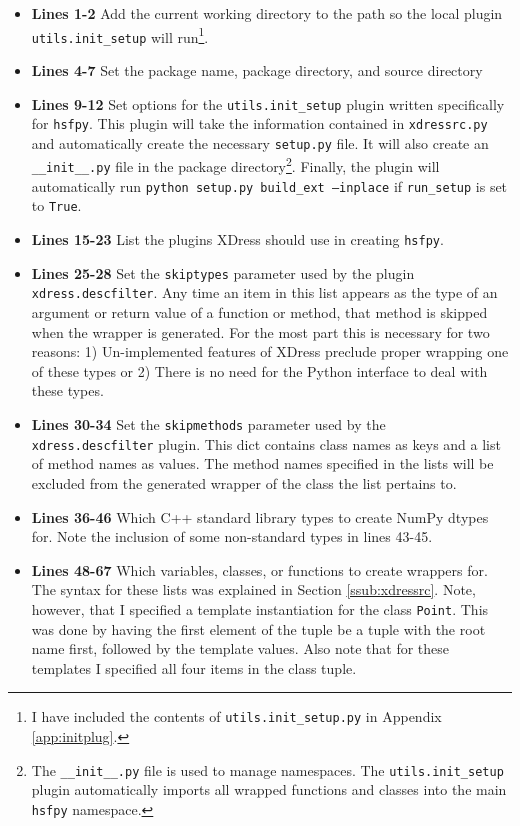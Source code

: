   \begin{itemize}
    \item \textbf{Lines 1-2} Add the current working directory to the path so the local plugin \texttt{utils.init\_setup} will run\footnote{I have included the contents of \texttt{utils.init\_setup.py} in Appendix \ref{app:initplug}.}.
    \item \textbf{Lines 4-7} Set the package name, package directory, and source directory
    \item \textbf{Lines 9-12} Set options for the \texttt{utils.init\_setup} plugin written specifically for \texttt{hsfpy}. This plugin will take the information contained in \texttt{xdressrc.py} and automatically create the necessary \texttt{setup.py} file. It will also create an \texttt{\_\_init\_\_.py} file in the package directory\footnote{The \texttt{\_\_init\_\_.py} file is used to manage namespaces. The \texttt{utils.init\_setup} plugin automatically imports all wrapped functions and classes into the main \texttt{hsfpy} namespace.}. Finally, the plugin will automatically run \texttt{python setup.py build\_ext --inplace} if \texttt{run\_setup} is set to \texttt{True}.
    \item \textbf{Lines 15-23} List the plugins XDress should use in creating \texttt{hsfpy}.
    \item \textbf{Lines 25-28} Set the \texttt{skiptypes} parameter used by the plugin \texttt{xdress.descfilter}. Any time an item in this list appears as the type of an argument or return value of a function or method, that method is skipped when the wrapper is generated. For the most part this is necessary for two reasons: 1) Un-implemented features of XDress preclude proper wrapping one of these types or 2) There is no need for the Python interface to deal with these types.
    \item \textbf{Lines 30-34} Set the \texttt{skipmethods} parameter used by the \texttt{xdress.descfilter} plugin. This dict contains class names as keys and a list of method names as values. The method names specified in the lists will be excluded from the generated wrapper of the class the list pertains to.
    \item \textbf{Lines 36-46} Which C++ standard library types to create NumPy dtypes for. Note the inclusion of some non-standard types in lines 43-45.
    \item \textbf{Lines 48-67} Which variables, classes, or functions to create wrappers for. The syntax for these lists was explained in Section \ref{ssub:xdressrc}. Note, however, that I specified a template instantiation for the class \texttt{Point}. This was done by having the first element of the tuple be a tuple with the root name first, followed by the template values. Also note that for these templates I specified all four items in the class tuple.
  \end{itemize}
  \mainstretch{}

